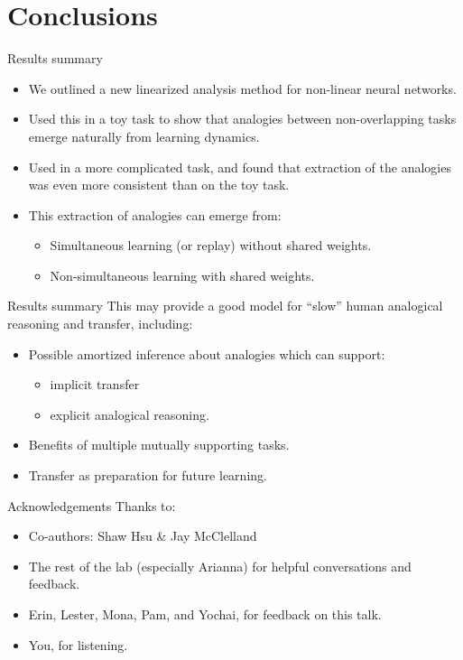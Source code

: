 \documentclass{beamer}
\begin{document}
\section{Conclusions}
\begin{frame}{Results summary}
\begin{itemize}
    \item<1-> We outlined a new linearized analysis method for non-linear neural networks. 
    \item<2-> Used this in a toy task to show that analogies between non-overlapping tasks emerge naturally from learning dynamics. 
    \item<3-> Used in a more complicated task, and found that extraction of the analogies was even more consistent than on the toy task. 
    \item<4-> This extraction of analogies can emerge from:
    \begin{itemize}
	\item<5-> Simultaneous learning (or replay) without shared weights. 
	\item<6-> Non-simultaneous learning with shared weights.
    \end{itemize}
\end{itemize}
\end{frame}

\begin{frame}{Results summary}
This may provide a good model for ``slow'' human analogical reasoning and transfer, including:
\begin{itemize}
    \item<2-> Possible amortized inference about analogies which can support:
    \begin{itemize}
	\item implicit transfer
	\item explicit analogical reasoning.
    \end{itemize}
    \item<3-> Benefits of multiple mutually supporting tasks.
    \item<4-> Transfer as preparation for future learning.
\end{itemize}
\end{frame}

\begin{frame}{Acknowledgements}
Thanks to:
\begin{itemize}
    \item Co-authors: Shaw Hsu \& Jay McClelland
    \item The rest of the lab (especially Arianna) for helpful conversations and feedback. 
    \item Erin, Lester, Mona, Pam, and Yochai, for feedback on this talk.
    \item You, for listening.
\end{itemize}
\end{frame}
\end{document}
